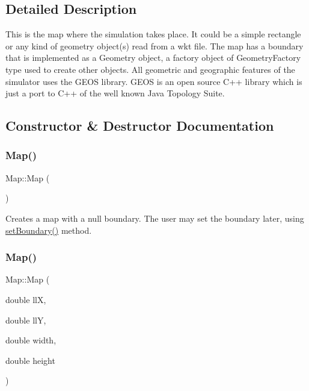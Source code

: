 \subsection{Detailed Description}
This is the map where the simulation takes place. It could be a simple rectangle or any kind of geometry object(s) read from a wkt file. The map has a boundary that is implemented as a Geometry object, a factory object of Geometry\+Factory type used to create other objects. All geometric and geographic features of the simulator uses the G\+E\+OS library. G\+E\+OS is an open source C++ library which is just a port to C++ of the well known Java Topology Suite. 

\subsection{Constructor \& Destructor Documentation}
\mbox{\label{class_map_a0f5ad0fd4563497b4214038cbca8b582}} 
\subsubsection{\texorpdfstring{Map()}{Map()}\hspace{0.1cm}{\footnotesize\ttfamily [1/3]}}
{\footnotesize\ttfamily Map\+::\+Map (\begin{DoxyParamCaption}{ }\end{DoxyParamCaption})}

Creates a map with a null boundary. The user may set the boundary later, using \hyperlink{class_map_acede2ccba9bf0f987f3dde8c332bec17}{set\+Boundary()} method. \mbox{\label{class_map_a4c9545a0252613e2a6808932fe83f9ad}} 
\subsubsection{\texorpdfstring{Map()}{Map()}\hspace{0.1cm}{\footnotesize\ttfamily [2/3]}}
{\footnotesize\ttfamily Map\+::\+Map (\begin{DoxyParamCaption}\item[{double}]{llX,  }\item[{double}]{llY,  }\item[{double}]{width,  }\item[{double}]{height }\end{DoxyParamCaption})}

